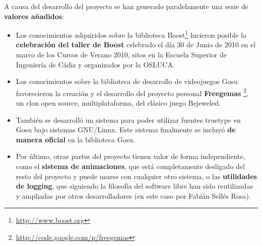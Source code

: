 \documentclass{article}
\begin{document}
A causa del desarrollo del proyecto se han generado paralelamente una
serie de \textbf{valores añadidos}:
\begin{itemize}
\item Los conocimientos adquiridos sobre la biblioteca
  Boost\footnote{\url{http://www.boost.org}} hicieron posible la
  \textbf{celebración del taller de Boost} celebrado el día 30 de
  Junio de 2010 en el marco de los Cursos de Verano 2010, sitos en la
  Escuela Superior de Ingeniería de Cádiz y organizados por la OSLUCA.
\item Los conocimientos sobre la biblioteca de desarrollo de
  videojuegos Gosu favorecieron la creación y el desarrollo del
  proyecto personal \textbf{Freegemas}
  \footnote{\url{http://code.google.com/p/freegemas}}, un clon open source,
  multiplataforma, del clásico juego Bejeweled.
\item También se desarrolló un sistema para poder utilizar fuentes
  truetype en Gosu bajo sistemas GNU/Linux. Este sistema finalmente se
  incluyó \textbf{de manera oficial} en la biblioteca Gosu.
\item Por último, otras partes del proyecto tienen valor de forma
  independiente, como el \textbf{sistema de animaciones}, que está
  completamente desligado del resto del proyecto y puede usarse con
  cualquier otro sistema, o las \textbf{utilidades de logging}, que
  siguiendo la filosofía del software libre han sido reutilizadas y
  ampliadas por otros desarrolladores (en este caso por Fabián Sellés
  Rosa).
\end{itemize}
\end{document}
